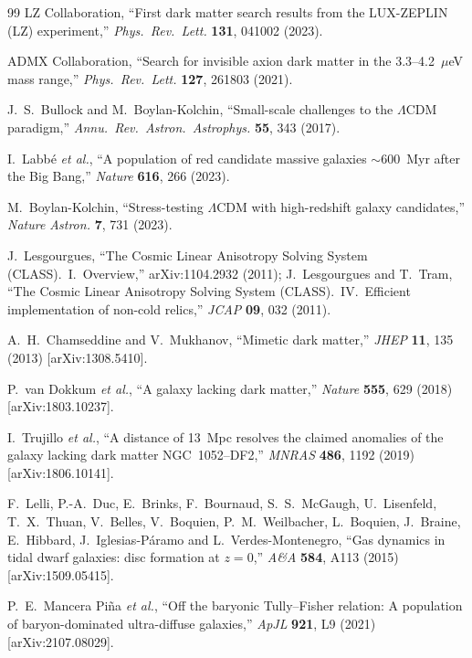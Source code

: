 \documentclass[aps,prd,twocolumn,nofootinbib,floatfix,superscriptaddress]{revtex4-2}
\begin{document}
\begin{thebibliography}{99}
 LZ Collaboration, ``First dark matter search
results from the LUX-ZEPLIN (LZ) experiment,''
\textit{Phys.~Rev.~Lett.} \textbf{131}, 041002 (2023).

 ADMX Collaboration, ``Search for invisible axion
dark matter in the 3.3--4.2~$\mu$eV mass range,''
\textit{Phys.~Rev.~Lett.} \textbf{127}, 261803 (2021).


 J.~S.~Bullock and
M.~Boylan-Kolchin, ``Small-scale challenges to the $\Lambda$CDM
paradigm,'' \textit{Annu.~Rev.~Astron.~Astrophys.} \textbf{55}, 343
(2017).

 I.~Labb\'e \emph{et al.}, ``A population of
red candidate massive galaxies $\sim 600$~Myr after the Big Bang,''
\textit{Nature} \textbf{616}, 266 (2023).

 M.~Boylan-Kolchin, ``Stress-testing
$\Lambda$CDM with high-redshift galaxy candidates,''
\textit{Nature Astron.} \textbf{7}, 731 (2023).

 J.~Lesgourgues, ``The Cosmic Linear
Anisotropy Solving System (CLASS).~I.~Overview,''
arXiv:1104.2932 (2011); J.~Lesgourgues and T.~Tram, ``The Cosmic
Linear Anisotropy Solving System (CLASS).~IV.~Efficient
implementation of non-cold relics,''
\textit{JCAP} \textbf{09}, 032 (2011).

 A.~H.~Chamseddine and V.~Mukhanov,
``Mimetic dark matter,''
\textit{JHEP} \textbf{11}, 135 (2013) [arXiv:1308.5410].

 P.~van Dokkum \emph{et al.}, ``A galaxy
lacking dark matter,''
\textit{Nature} \textbf{555}, 629 (2018) [arXiv:1803.10237].

 I.~Trujillo \emph{et al.}, ``A distance of
13~Mpc resolves the claimed anomalies of the galaxy lacking dark
matter NGC~1052--DF2,''
\textit{MNRAS} \textbf{486}, 1192 (2019) [arXiv:1806.10141].

 F.~Lelli, P.-A.~Duc, E.~Brinks, F.~Bournaud,
S.~S.~McGaugh, U.~Lisenfeld, T.~X.~Thuan, V.~Belles, V.~Boquien,
P.~M.~Weilbacher, L.~Boquien, J.~Braine, E.~Hibbard, J.~Iglesias-P\'aramo
and L.~Verdes-Montenegro,
``Gas dynamics in tidal dwarf galaxies: disc formation at $z=0$,''
\textit{A\&A} \textbf{584}, A113 (2015) [arXiv:1509.05415].

 P.~E.~Mancera Pi\~na \emph{et al.}, ``Off the
baryonic Tully--Fisher relation: A population of baryon-dominated
ultra-diffuse galaxies,''
\textit{ApJL} \textbf{921}, L9 (2021) [arXiv:2107.08029].


\end{thebibliography}
\end{document}
